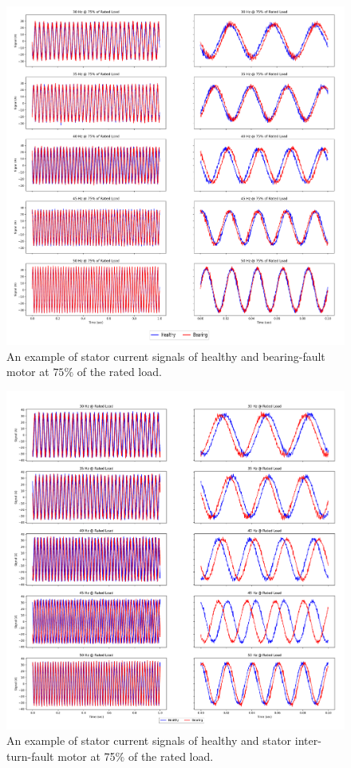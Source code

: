 \begin{figure}[p]
	\centering
	\includegraphics[width=0.75\paperwidth,keepaspectratio=true]{./fig/bearing_75.png}
	\caption{An example of stator current signals of healthy and bearing-fault motor at $75\%$ of the rated load.}	
	\label{bearing75}
\end{figure}
\pagebreak
\begin{figure}[p]
	\centering
	\includegraphics[width=0.75\paperwidth,keepaspectratio=true]{./fig/stator_100.png}
	\caption{An example of stator current signals of healthy and stator inter-turn-fault motor at 75$\%$ of the rated load.}	
	\label{stator100}
\end{figure}
